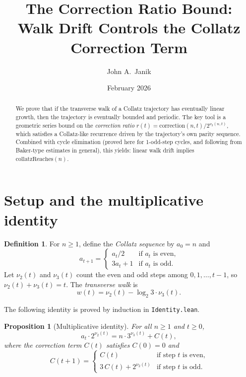 \documentclass[11pt,a4paper]{article}
\title{The Correction Ratio Bound:\\
Walk Drift Controls the Collatz Correction Term}
\author{John A.\ Janik}
\date{February 2026}
\theoremstyle{plain}
\newtheorem{proposition}[theorem]{Proposition}
\theoremstyle{definition}
\newtheorem{definition}[theorem]{Definition}
\begin{document}
\maketitle

\begin{abstract}
We prove that if the transverse walk of a Collatz trajectory has
eventually linear growth, then the trajectory is eventually bounded
and periodic.  The key tool is a geometric series bound on the
\emph{correction ratio} $r(t) = \mathrm{correction}(n,t) / 2^{\nu_2(n,t)}$,
which satisfies a Collatz-like recurrence driven by the trajectory's
own parity sequence.  Combined with cycle elimination (proved here
for 1-odd-step cycles, and following from Baker-type estimates in
general), this yields: linear walk drift implies
$\mathrm{collatzReaches}(n)$.
\end{abstract}

\section{Setup and the multiplicative identity}

\begin{definition}
For $n \ge 1$, define the \emph{Collatz sequence} by $a_0 = n$ and
\[
  a_{t+1} =
  \begin{cases}
    a_t / 2 & \text{if } a_t \text{ is even,} \\
    3 a_t + 1 & \text{if } a_t \text{ is odd.}
  \end{cases}
\]
Let $\nu_2(t)$ and $\nu_3(t)$ count the even and odd steps among
$0, 1, \ldots, t-1$, so $\nu_2(t) + \nu_3(t) = t$.  The
\emph{transverse walk} is
\[
  w(t) = \nu_2(t) - \log_2 3 \cdot \nu_3(t).
\]
\end{definition}

The following identity is proved by induction in \texttt{Identity.lean}.

\begin{proposition}[Multiplicative identity]\label{prop:identity}
For all $n \ge 1$ and $t \ge 0$,
\[
  a_t \cdot 2^{\nu_2(t)} = n \cdot 3^{\nu_3(t)} + C(t),
\]
where the \emph{correction term} $C(t)$ satisfies $C(0) = 0$ and
\begin{equation}\label{eq:corr-recurrence}
  C(t+1) =
  \begin{cases}
    C(t) & \text{if step } t \text{ is even,} \\
    3\, C(t) + 2^{\nu_2(t)} & \text{if step } t \text{ is odd.}
  \end{cases}
\end{equation}
\end{proposition}
\end{document}
